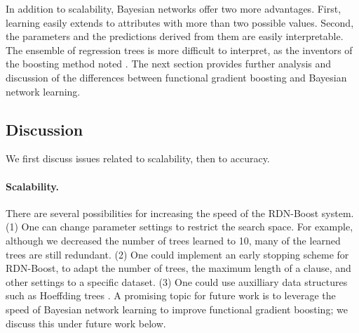 \documentclass[runningheads,a4paper]{llncs}
\begin{document}
In addition to scalability, Bayesian networks offer two more advantages. First, learning easily extends to attributes with more than two possible values. Second, the parameters and the predictions derived from them are easily interpretable. The ensemble of regression trees is more difficult to interpret, as the inventors of the boosting method noted  \cite{Natarajan2012}. The next section provides further analysis and discussion of the differences between functional gradient boosting and Bayesian network learning.

\subsection{Discussion} We first discuss issues related to scalability, then to accuracy.
 
\paragraph{Scalability.} 


There are several possibilities for increasing the speed of the RDN-Boost system. (1) One can change parameter settings to restrict the search space. For example, although we decreased the number of trees learned to 10, many of the learned trees are still redundant. (2) One could implement an early stopping scheme for RDN-Boost, to adapt the number of trees, the maximum length of a clause, and other settings to a specific dataset. (3) One could use auxilliary data structures such as Hoeffding trees \cite{hoeffding}. A promising topic for future work is to leverage the speed of Bayesian network learning to improve functional gradient boosting; we discuss this under future work below.
 
\end{document}

